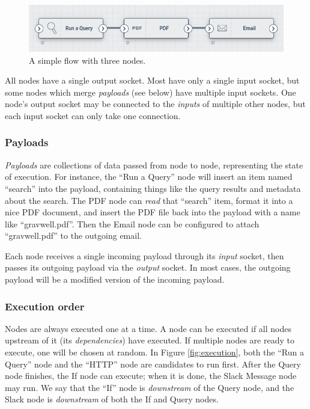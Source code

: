 \begin{figure}
	\includegraphics[width=0.7\linewidth]{images/nodes.png}
	\caption{A simple flow with three nodes.}
	\label{fig:nodes}
\end{figure}

All nodes have a single output socket. Most have only a single input socket, but some nodes which merge \emph{payloads} (see below) have multiple input sockets. One node's output socket may be connected to the \emph{inputs} of multiple other nodes, but each input socket can only take one connection.

\subsubsection{Payloads}

\emph{Payloads} are collections of data passed from node to node, representing the state of execution. For instance, the ``Run a Query'' node will insert an item named ``search'' into the payload, containing things like the query results and metadata about the search. The PDF node can \emph{read} that ``search'' item, format it into a nice PDF document, and insert the PDF file back into the payload with a name like ``gravwell.pdf''. Then the Email node can be configured to attach ``gravwell.pdf'' to the outgoing email.

Each node receives a single incoming payload through its \emph{input} socket, then passes its outgoing payload via the \emph{output} socket. In most cases, the outgoing payload will be a modified version of the incoming payload.

\subsubsection{Execution order}

Nodes are always executed one at a time. A node can be executed if all nodes upstream of it (its \emph{dependencies}) have executed. If multiple nodes are ready to execute, one will be chosen at random. In Figure \ref{fig:execution}, both the ``Run a Query'' node and the ``HTTP'' node are candidates to run first. After the Query node finishes, the If node can execute; when it is done, the Slack Message node may run. We say that the ``If'' node is \emph{downstream} of the Query node, and the Slack node is \emph{downstream} of both the If and Query nodes.

